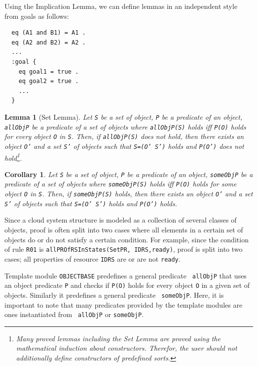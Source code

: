 \documentclass[12pt]{report}
\newtheorem{lemma}{Lemma}
\newtheorem{corollary}{Corollary}
\newcommand{\stt}[1]{{\small{\tt {#1}}}}
\begin{document}
Using the Implication Lemma, we can define lemmas in an independent
style from goals as follows:
\small
\begin{verbatim}
  eq (A1 and B1) = A1 .
  eq (A2 and B2) = A2 .
  ...
  :goal {
    eq goal1 = true .
    eq goal2 = true .
    ...
  }
\end{verbatim}
\normalsize

\begin{lemma}[Set Lemma]
Let {\tt S} be a set of object, {\tt P} be a predicate of an object,
{\tt allObjP} be a predicate of a set of objects where
\stt{allObjP(S)} holds iff \stt{P(O)} holds for every object {\tt O}
in {\tt S}. Then, if \stt{allObjP(S)} does not hold, then there exists
an object {\tt O'} and a set {\tt S'} of objects such that \stt{S=(O'
  S')} holds and \stt{P(O')} does not hold\footnote{Many proved lemmas
  including the Set Lemma are proved using the mathematical induction
  about constructors. Therefor, the user should not additionally define
  constructors of predefined sorts.}.
\end{lemma}
\begin{corollary}
Let {\tt S} be a set of object, {\tt P} be a predicate of an object,
{\tt someObjP} be a predicate of a set of objects where
\stt{someObjP(S)} holds iff \stt{P(O)} holds for some object {\tt O}
in {\tt S}. Then, if \stt{someObjP(S)} holds, then there exists an
object {\tt O'} and a set {\tt S'} of objects such that \stt{S=(O'
  S')} holds and \stt{P(O')} holds.
\end{corollary}
Since a cloud system structure is modeled as a collection of several
classes of objects, proof is often split into two cases where all
elements in a certain set of objects do or do not satisfy a certain
condition.  For example, since the condition of rule {\tt R01} is 
\stt{allPROfRSInStates(SetPR, IDRS,ready)}, proof is split into two
cases; all properties of resource {\tt IDRS} are or are not
{\tt ready}.

Template module {\tt OBJECTBASE} predefines a general predicate {\tt
  allObjP} that uses an object predicate {\tt P} and checks if
\stt{P(O)} holds for every object {\tt O} in a given set of
objects. Similarly it predefines a general predicate {\tt
  someObjP}. Here, it is important to note that many predicates
provided by the template modules are ones instantiated from {\tt
  allObjP} or {\tt someObjP}.
\end{document}
